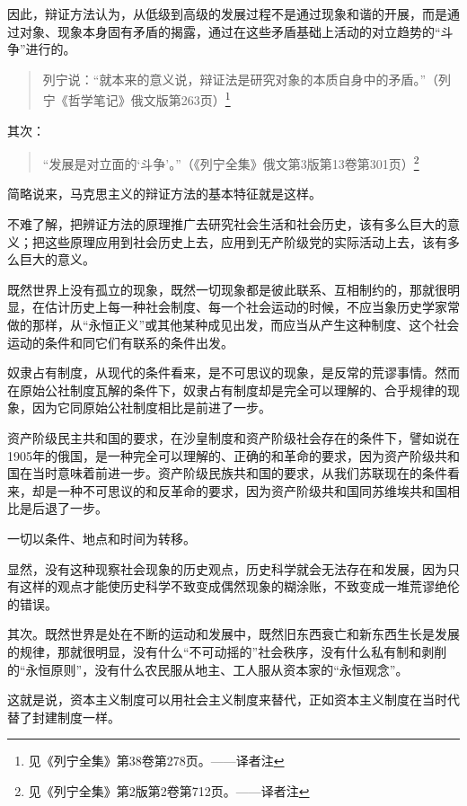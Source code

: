 因此，辩证方法认为，从低级到高级的发展过程不是通过现象和谐的开展，而是通过对象、现象本身固有矛盾的揭露，通过在这些矛盾基础上活动的对立趋势的“斗争”进行的。

\begin{quotation}
列宁说：“就本来的意义说，辩证法是研究对象的本质自身中的矛盾。”（列宁《哲学笔记》俄文版第263页）\footnote{见《列宁全集》第38卷第278页。——译者注}
\end{quotation}

其次：

\begin{quotation}
“发展是对立面的‘斗争’。”（《列宁全集》俄文第3版第13卷第301页）\footnote{见《列宁全集》第2版第2卷第712页。——译者注}
\end{quotation}

简略说来，马克思主义的辩证方法的基本特征就是这样。

不难了解，把辨证方法的原理推广去研究社会生活和社会历史，该有多么巨大的意义；把这些原理应用到社会历史上去，应用到无产阶级党的实际活动上去，该有多么巨大的意义。

既然世界上没有孤立的现象，既然一切现象都是彼此联系、互相制约的，那就很明显，在估计历史上每一种社会制度、每一个社会运动的时候，不应当象历史学家常做的那样，从“永恒正义”或其他某种成见出发，而应当从产生这种制度、这个社会运动的条件和同它们有联系的条件出发。

奴隶占有制度，从现代的条件看来，是不可思议的现象，是反常的荒谬事情。然而在原始公社制度瓦解的条件下，奴隶占有制度却是完全可以理解的、合乎规律的现象，因为它同原始公社制度相比是前进了一步。

资产阶级民主共和国的要求，在沙皇制度和资产阶级社会存在的条件下，譬如说在1905年的俄国，是一种完全可以理解的、正确的和革命的要求，因为资产阶级共和国在当时意味着前进一步。资产阶级民族共和国的要求，从我们苏联现在的条件看来，却是一种不可思议的和反革命的要求，因为资产阶级共和国同苏维埃共和国相比是后退了一步。

一切以条件、地点和时间为转移。

显然，没有这种现察社会现象的历史观点，历史科学就会无法存在和发展，因为只有这样的观点才能使历史科学不致变成偶然现象的糊涂账，不致变成一堆荒谬绝伦的错误。

其次。既然世界是处在不断的运动和发展中，既然旧东西衰亡和新东西生长是发展的规律，那就很明显，没有什么“不可动摇的”社会秩序，没有什么私有制和剥削的“永恒原则”，没有什么农民服从地主、工人服从资本家的“永恒观念”。

这就是说，资本主义制度可以用社会主义制度来替代，正如资本主义制度在当时代替了封建制度一样。

